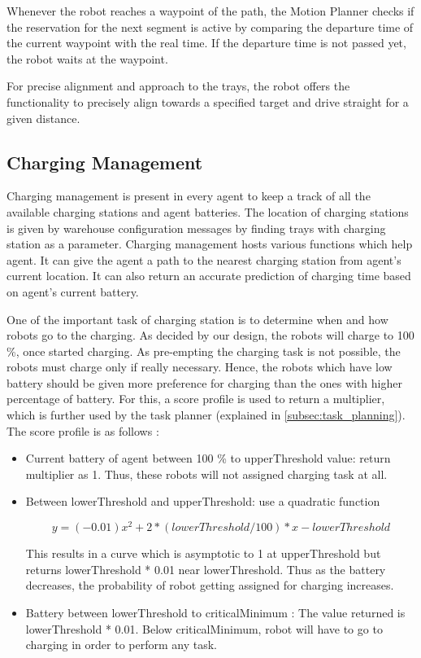 \documentclass[journal]{IEEEtran}
\begin{document}
Whenever the robot reaches a waypoint of the path, the Motion Planner checks if the reservation for the next segment is active by comparing the departure time of the current waypoint with the real time. If the departure time is not passed yet, the robot waits at the waypoint.

For precise alignment and approach to the trays, the robot offers the functionality to precisely align towards a specified target and drive straight for a given distance.

\subsection{Charging Management}
\label{subsec:charging_management}

Charging management is present in every agent to keep a track of all the available charging stations and agent batteries. The location of charging stations is given by warehouse configuration messages by finding trays with charging station as a parameter. Charging management hosts various functions which help agent. It can give the agent a path to the nearest charging station from agent's current location. It can also return an accurate prediction of charging time based on agent's current battery.

One of the important task of charging station is to determine when and how robots go to the charging. As decided by our design, the robots will charge to 100 \%, once started charging. As pre-empting the charging task is not possible, the robots must charge only if really necessary. Hence, the robots which have low battery should be given more preference for charging than the ones with higher percentage of battery. For this, a score profile is used to return a multiplier, which is further used by the task planner (explained in \ref{subsec:task_planning}). The score profile is as follows :
\begin{itemize}
\item Current battery of agent between 100 \% to upperThreshold value: return multiplier as 1. Thus, these robots will not assigned charging task at all. 
\item Between lowerThreshold and upperThreshold: use a quadratic function

\[y = (-0.01)x^2+2 *(lowerThreshold/100)*x -lowerThreshold\]

This results in a curve which is asymptotic to 1 at upperThreshold but returns lowerThreshold * 0.01 near lowerThreshold. Thus as the battery decreases, the probability of robot getting assigned for charging increases.

\item Battery between lowerThreshold to criticalMinimum : The value returned is lowerThreshold * 0.01. Below criticalMinimum, robot will have to go to charging in order to perform any task.
\end{itemize}
  
\end{document}
